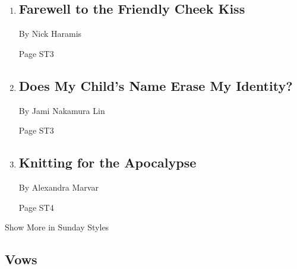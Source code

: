 \begin{enumerate}
\def\labelenumi{\arabic{enumi}.}
\item
  \href{/2020/05/01/t-magazine/cheek-kiss.html}{}

  \hypertarget{farewell-to-the-friendly-cheek-kiss}{%
  \subsection{Farewell to the Friendly Cheek
  Kiss}\label{farewell-to-the-friendly-cheek-kiss}}

  By Nick Haramis

  Page ST3
\item
  \href{/2020/05/05/parenting/baby-name-family-history.html}{}

  \hypertarget{does-my-childs-name-erase-my-identity}{%
  \subsection{Does My Child's Name Erase My
  Identity?}\label{does-my-childs-name-erase-my-identity}}

  By Jami Nakamura Lin

  Page ST3
\item
  \href{/2020/05/08/style/self-care/knitting-for-the-apocalypse.html}{}

  \hypertarget{knitting-for-the-apocalypse}{%
  \subsection{Knitting for the
  Apocalypse}\label{knitting-for-the-apocalypse}}

  By Alexandra Marvar

  Page ST4
\end{enumerate}

Show More in Sunday Styles

\hypertarget{vows}{%
\subsection{Vows}\label{vows}}

